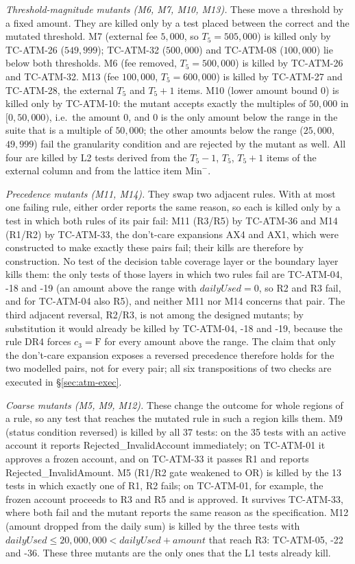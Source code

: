 \documentclass[11pt,a4paper]{article}
\begin{document}
\emph{Threshold-magnitude mutants (M6, M7, M10, M13).} These move a
threshold by a fixed amount. They are killed only by a test placed between
the correct and the mutated threshold. M7 (external fee \(5{,}000\), so
\(T_5=505{,}000\)) is killed only by TC-ATM-26 (\(549{,}999\)); TC-ATM-32
(\(500{,}000\)) and TC-ATM-08 (\(100{,}000\)) lie below both thresholds. M6
(fee removed, \(T_5=500{,}000\)) is killed by TC-ATM-26 and TC-ATM-32. M13
(fee \(100{,}000\), \(T_5=600{,}000\)) is killed by TC-ATM-27 and TC-ATM-28,
the external \(T_5\) and \(T_5+1\) items. M10 (lower amount bound \(0\)) is
killed only by TC-ATM-10: the mutant accepts exactly the multiples of
\(50{,}000\) in \([0,50{,}000)\), i.e.\ the amount \(0\), and \(0\) is the
only amount below the range in the suite that is a multiple of
\(50{,}000\); the other amounts below the range (\(25{,}000\), \(49{,}999\))
fail the granularity condition and are rejected by the mutant as well. All four are killed by L2 tests derived from the
\(T_5-1\), \(T_5\), \(T_5+1\) items of the external column and from the
lattice item \(\mathrm{Min}^-\).

\emph{Precedence mutants (M11, M14).} They swap two adjacent rules. With at
most one failing rule, either order reports the same reason, so each is
killed only by a test in which both rules of its pair fail: M11 (R3/R5) by
TC-ATM-36 and M14 (R1/R2) by TC-ATM-33, the don't-care expansions AX4 and
AX1, which were constructed to make exactly these pairs fail; their kills
are therefore by construction. No test of the decision table coverage layer
or the boundary layer kills them: the only tests of those layers in which
two rules fail are TC-ATM-04, -18 and -19 (an amount above the range with
\(\mathit{dailyUsed}=0\), so R2 and R3 fail, and for TC-ATM-04 also R5), and
neither M11 nor M14 concerns that pair. The third adjacent reversal, R2/R3,
is not among the designed mutants; by substitution it would already be
killed by TC-ATM-04, -18 and -19, because the rule DR4 forces
\(c_3=\mathrm{F}\) for every amount above the range. The claim that only the
don't-care expansion exposes a reversed precedence therefore holds for the
two modelled pairs, not for every pair; all six transpositions of two checks
are executed in \S\ref{sec:atm-exec}.

\emph{Coarse mutants (M5, M9, M12).} These change the outcome for whole
regions of a rule, so any test that reaches the mutated rule in such a
region kills them. M9 (status condition reversed) is
killed by all 37 tests: on the 35 tests with an active account it reports
Rejected\_InvalidAccount immediately; on TC-ATM-01 it approves a frozen
account, and on TC-ATM-33 it passes R1 and reports Rejected\_InvalidAmount.
M5 (R1/R2 gate weakened to OR) is killed by the 13 tests in which exactly
one of R1, R2 fails; on TC-ATM-01, for example, the frozen account proceeds
to R3 and R5 and is approved. It survives TC-ATM-33, where both fail and the
mutant reports the same reason as the specification. M12 (amount dropped
from the daily sum) is killed by the three tests with
\(\mathit{dailyUsed}\le20{,}000{,}000<\mathit{dailyUsed}+\mathit{amount}\)
that reach R3: TC-ATM-05, -22 and -36. These three mutants are the only
ones that the L1 tests already kill.
\end{document}
